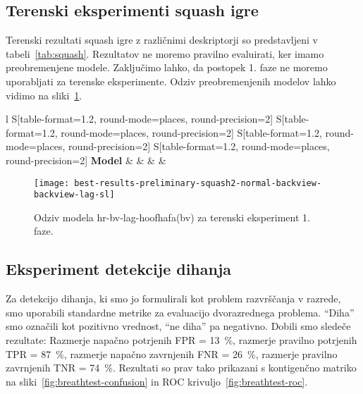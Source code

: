 \subsection{Terenski eksperimenti squash igre}
Terenski rezultati squash igre z različnimi deskriptorji so predstavljeni v tabeli~\ref{tab:squash}.  Rezultatov ne moremo pravilno evaluirati, ker imamo preobremenjene modele. Zaključimo lahko, da postopek 1. faze ne moremo uporabljati za terenske eksperimente. Odziv preobremenjenih modelov lahko vidimo na sliki~\ref{fig:squash-rezultat}.

\begin{table}[!htbp]
	\centering
	\begin{tabular}{l S[table-format=1.2, round-mode=places, round-precision=2] S[table-format=1.2, round-mode=places, round-precision=2] S[table-format=1.2, round-mode=places, round-precision=2] S[table-format=1.2, round-mode=places, round-precision=2]}
		\toprule
		\textbf{Model} & \thead{\corr} & \thead{\rae} & \thead{\rrse} & \theadm{\nsv}\\
		\midrule
		\bottomrule
	\end{tabular}
	\caption[Validacijske metrike terenskega testiranja]{Validacijske metrike terenskega testiranja. Tu uporabljamo HOOF in HOOF-HAFA deskriptorje. Modeli so neveljavni.}
	\label{tab:squash}
\end{table}

\begin{figure}[!htbp]
	\centering
	\texttt{[image: best-results-preliminary-squash2-normal-backview-backview-lag-sl]}
	\caption[Odziv modela hr-bv-lag-hoofhafa(bv) za terenski eksperiment 1. faze]{Odziv modela hr-bv-lag-hoofhafa(bv) za terenski eksperiment 1. faze.}
	\label{fig:squash-rezultat}
\end{figure}






















\subsection{Eksperiment detekcije dihanja}
Za detekcijo dihanja, ki smo jo formulirali kot problem razvrščanja v razrede, smo uporabili standardne metrike za evaluacijo dvorazrednega problema. ``Diha'' smo označili kot pozitivno vrednost, ``ne diha'' pa negativno. Dobili smo sledeče rezultate: Razmerje napačno potrjenih FPR = \SI{13}{\%}, razmerje pravilno potrjenih TPR = \SI{87}{\%}, razmerje napačno zavrnjenih FNR = \SI{26}{\%}, razmerje pravilno zavrnjenih TNR = \SI{74}{\%}. Rezultati so prav tako prikazani s kontigenčno matriko na sliki~\ref{fig:breathtest-confusion} in ROC krivuljo~\ref{fig:breathtest-roc}.

